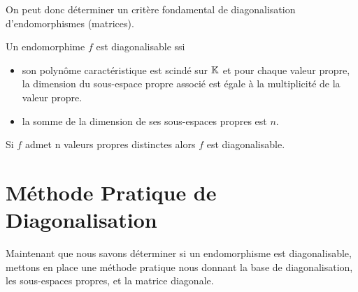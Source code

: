 On peut donc déterminer un critère fondamental de diagonalisation d'endomorphismes (matrices). 

\begin{criteria}
    Un endomorphime $f$ est diagonalisable ssi 
    \begin{itemize}
        \item son polynôme caractéristique est scindé sur $\mathbb{K}$ et pour chaque valeur propre, 
        la dimension du sous-espace propre associé est égale à la multiplicité de la valeur propre. 
        \item la somme de la dimension de ses sous-espaces propres est $n$. 
    \end{itemize}
\end{criteria}

\begin{corollary}
    Si $f$ admet n valeurs propres distinctes alors $f$ est diagonalisable. 
\end{corollary}


\section{Méthode Pratique de Diagonalisation}

Maintenant que nous savons déterminer si un endomorphisme est diagonalisable, mettons en place 
une méthode pratique nous donnant la base de diagonalisation, les sous-espaces propres, et la matrice diagonale. 

